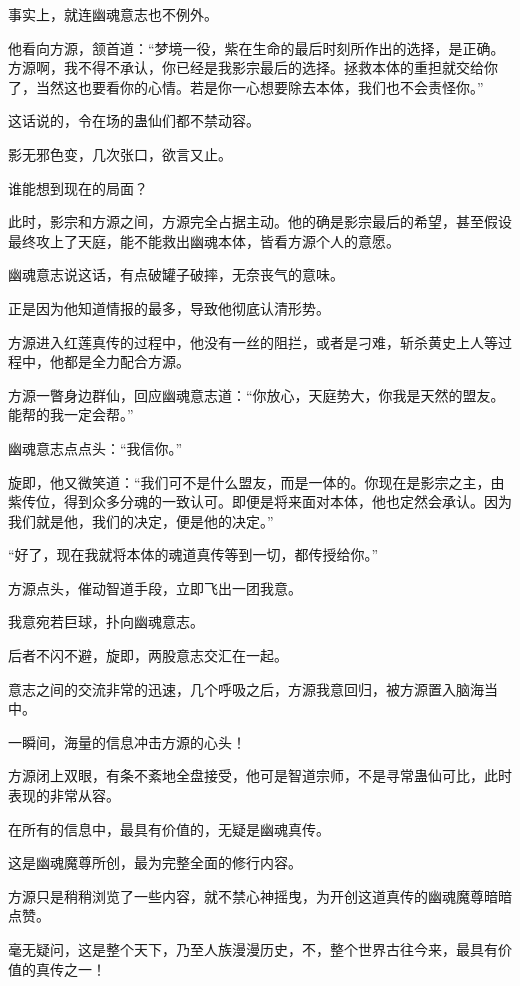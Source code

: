 \begin{this_body}
事实上，就连幽魂意志也不例外。

他看向方源，颔首道：“梦境一役，紫在生命的最后时刻所作出的选择，是正确。方源啊，我不得不承认，你已经是我影宗最后的选择。拯救本体的重担就交给你了，当然这也要看你的心情。若是你一心想要除去本体，我们也不会责怪你。”

这话说的，令在场的蛊仙们都不禁动容。

影无邪色变，几次张口，欲言又止。

谁能想到现在的局面？

此时，影宗和方源之间，方源完全占据主动。他的确是影宗最后的希望，甚至假设最终攻上了天庭，能不能救出幽魂本体，皆看方源个人的意愿。

幽魂意志说这话，有点破罐子破摔，无奈丧气的意味。

正是因为他知道情报的最多，导致他彻底认清形势。

方源进入红莲真传的过程中，他没有一丝的阻拦，或者是刁难，斩杀黄史上人等过程中，他都是全力配合方源。

方源一瞥身边群仙，回应幽魂意志道：“你放心，天庭势大，你我是天然的盟友。能帮的我一定会帮。”

幽魂意志点点头：“我信你。”

旋即，他又微笑道：“我们可不是什么盟友，而是一体的。你现在是影宗之主，由紫传位，得到众多分魂的一致认可。即便是将来面对本体，他也定然会承认。因为我们就是他，我们的决定，便是他的决定。”

“好了，现在我就将本体的魂道真传等到一切，都传授给你。”

方源点头，催动智道手段，立即飞出一团我意。

我意宛若巨球，扑向幽魂意志。

后者不闪不避，旋即，两股意志交汇在一起。

意志之间的交流非常的迅速，几个呼吸之后，方源我意回归，被方源置入脑海当中。

一瞬间，海量的信息冲击方源的心头！

方源闭上双眼，有条不紊地全盘接受，他可是智道宗师，不是寻常蛊仙可比，此时表现的非常从容。

在所有的信息中，最具有价值的，无疑是幽魂真传。

这是幽魂魔尊所创，最为完整全面的修行内容。

方源只是稍稍浏览了一些内容，就不禁心神摇曳，为开创这道真传的幽魂魔尊暗暗点赞。

毫无疑问，这是整个天下，乃至人族漫漫历史，不，整个世界古往今来，最具有价值的真传之一！


\end{this_body}
